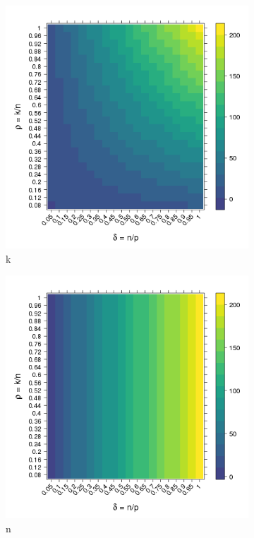 \documentclass[10pt,letterpaper]{article}
\begin{document}
\begin{figure}[tbhp] 
  \begin{adjustwidth}{-1.00in}{0in}
    \begin{subfigure}[b]{0.5\linewidth}
      \centering
      \includegraphics[totalheight=6cm]{./figs/k.png}
      \caption{k}
      \label{figure:k.png}
      \vspace{4ex}
    \end{subfigure} 
    \begin{subfigure}[b]{0.5\linewidth}
      \centering
      \includegraphics[totalheight=6cm]{./figs/n.png}
      \caption{n}
      \label{figure:n.png}
    \end{subfigure} 
    \caption{}
  \end{adjustwidth}
\end{figure}
\end{document}
